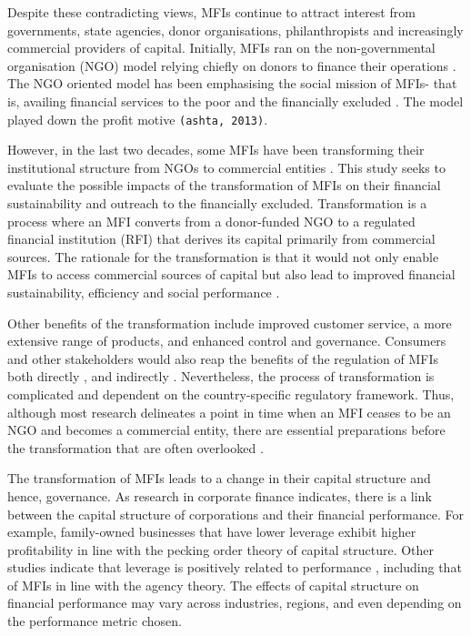 \documentclass[a4paper, nobind]{templates/ociamthesis}
\begin{document}
Despite these contradicting views, MFIs continue to attract interest from governments, state agencies, donor organisations, philanthropists and increasingly commercial providers of capital. Initially, MFIs ran on the non-governmental organisation (NGO) model relying chiefly on donors to finance their operations \autocite{d2017ngos}. The NGO oriented model has been emphasising the social mission of MFIs- that is, availing financial services to the poor and the financially excluded \autocite{ashta2012compartamos}. The model played down the profit motive \texttt{(ashta,\ 2013)}.

However, in the last two decades, some MFIs have been transforming their institutional structure from NGOs to commercial entities \autocite{d2017ngos}. This study seeks to evaluate the possible impacts of the transformation of MFIs on their financial sustainability and outreach to the financially excluded. Transformation is a process where an MFI converts from a donor-funded NGO to a regulated financial institution (RFI) that derives its capital primarily from commercial sources. The rationale for the transformation is that it would not only enable MFIs to access commercial sources of capital but also lead to improved financial sustainability, efficiency and social performance \autocite{louis2013financial}.

Other benefits of the transformation include improved customer service, a more extensive range of products, and enhanced control and governance\autocite{srnec2008transformation}. Consumers and other stakeholders would also reap the benefits of the regulation of MFIs both directly \textcite{meagher2006microfinance}, and indirectly \autocite{hartarska2007regulated}. Nevertheless, the process of transformation is complicated and dependent on the country-specific regulatory framework. Thus, although most research delineates a point in time when an MFI ceases to be an NGO and becomes a commercial entity, there are essential preparations before the transformation that are often overlooked \autocite{d2017ngos}.

The transformation of MFIs leads to a change in their capital structure and hence, governance. As research in corporate finance indicates, there is a link between the capital structure of corporations and their financial performance. For example, family-owned businesses that have lower leverage exhibit higher profitability \autocite{hamid2015capital} in line with the pecking order theory of capital structure. Other studies indicate that leverage is positively related to performance \autocite{fosu2013capital,berger2006capital}, including that of MFIs \autocite{kar2012does} in line with the agency theory. The effects of capital structure on financial performance may vary across industries, regions, and even depending on the performance metric chosen.
\end{document}
